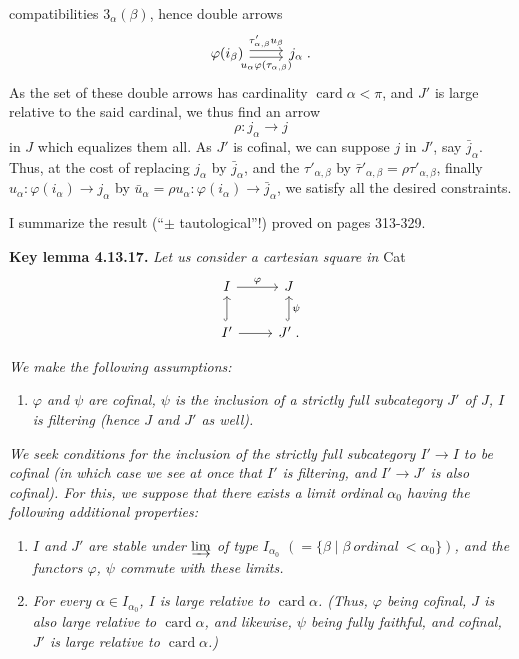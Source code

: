 \documentclass[11pt]{article}
\newcommand{\printedpage}[1]{\marginpar{\footnotesize p.~#1}}
\newcommand{\msp}[1]{\marginpar{\footnotesize [#1]}}
\DeclareMathOperator{\card}{card}
\begin{document}
\printedpage{124}

compatibilities $3_\alpha(\beta)$, hence double arrows
\[
\begin{tikzcd}
\varphi(i_\beta) \arrow[r, shift left, "\tau'_{\alpha,\beta}u_\beta"] \arrow[r, shift right, "u_\alpha\varphi(\tau_{\alpha,\beta})"'] & j_\alpha \; .
\end{tikzcd}
\]
As the set of these double arrows has cardinality $\card\alpha < \pi$, and $J'$ is large relative to the said cardinal, we
\msp{page 329}
thus find an arrow
\[
\rho : j_\alpha \longrightarrow j
\]
in $J$ which equalizes them all. As $J'$ is cofinal, we can suppose $j$ in $J'$, say $\bar{j}_\alpha$. Thus, at the cost of replacing $j_\alpha$ by $\bar{j}_\alpha$, and the $\tau'_{\alpha,\beta}$ by $\bar{\tau}'_{\alpha,\beta} = \rho\tau'_{\alpha,\beta}$, finally $u_\alpha : \varphi(i_\alpha) \longrightarrow j_\alpha$ by $\bar{u}_\alpha = \rho u_\alpha : \varphi(i_\alpha) \longrightarrow \bar{j}_\alpha$, we satisfy all the desired constraints.

I summarize the result (``$\pm$ tautological''!) proved on pages 313-329.

\textbf{Key lemma 4.13.17.} \textit{Let us consider a cartesian square in} Cat
\[
\begin{tikzcd}
I \arrow[r, "\varphi"] & J \\
I' \arrow[u, hook] \arrow[r] & J' \arrow[u, hook, "\psi"'] \; .
\end{tikzcd}
\]

\textit{We make the following assumptions:}

\msp{page 330}

\begin{enumerate}[label={}]
\item[\textit{1)}] \textit{$\varphi$ and $\psi$ are cofinal, $\psi$ is the inclusion of a strictly full subcategory $J'$ of $J$, $I$ is filtering (hence $J$ and $J'$ as well).}
\end{enumerate}

\textit{We seek conditions for the inclusion of the strictly full subcategory $I' \longrightarrow I$ to be cofinal (in which case we see at once that $I'$ is filtering, and $I' \longrightarrow J'$ is also cofinal). For this, we suppose that there exists a \textup{limit ordinal} $\alpha_0$ having the following additional properties:}

\begin{enumerate}[label={}]
\item[\textit{2)}] \textit{$I$ and $J'$ are stable under $\varinjlim$ of type $I_{\alpha_0}$ $(= \{\beta \mid \beta \ \textit{ordinal}\ < \alpha_0\})$, and the functors $\varphi$, $\psi$ commute with these limits.}
\item[\textit{3)}] \textit{For every $\alpha \in I_{\alpha_0}$, $I$ is large relative to $\card\alpha$. (Thus, $\varphi$ being cofinal, $J$ is also large relative to $\card\alpha$, and likewise, $\psi$ being fully faithful, and cofinal, $J'$ is large relative to $\card\alpha$.)}
\end{enumerate}
\end{document}
